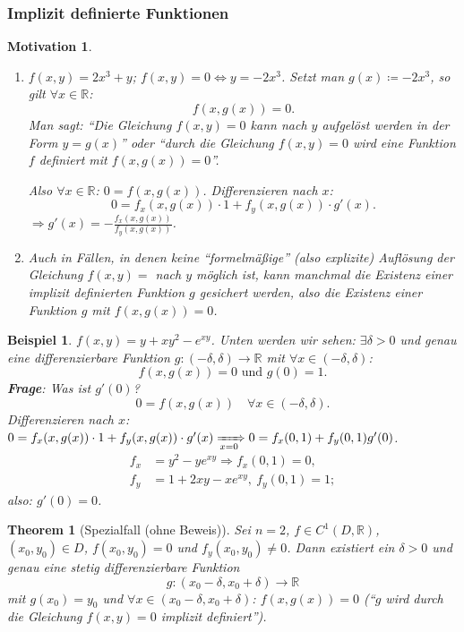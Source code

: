 \documentclass[12pt]{extreport} %
\newcommand{\R}{\mathbb{R}}
\theoremstyle{named}
\newtheorem{unnamedtheorem}{Theorem} \counterwithin{unnamedtheorem}{chapter}
\theoremstyle{nnamed}
\theoremstyle{itshape}
\theoremstyle{normal}
\newtheorem*{beispiel*}{Beispiel}
\newtheorem*{motivation}{Motivation}
\begin{document}
\subsubsection*{Implizit definierte Funktionen}

\begin{motivation} ~\
	\begin{enumerate}
		\item $f(x, y) = 2 x^{3} + y$; $f(x, y) = 0 \iff y = - 2 x^{3}$. Setzt man $g(x) \coloneqq - 2x^{3}$, so gilt $\forall x \in \R$:
			$$ f(x, g(x)) = 0. $$
			Man sagt: \enquote{Die Gleichung $f(x, y) = 0$ kann nach $y$ aufgelöst werden in der Form $y = g(x)$} 
			oder \enquote{durch die Gleichung $f(x, y) = 0$ wird eine Funktion $f$ definiert mit $f(x, g(x)) = 0$}.
			
			\bigskip
			
			Also $\forall x \in \R$: $0 = f(x, g(x))$. Differenzieren nach $x$:
			$$ 0 = f_{x}(x, g(x)) \cdot 1 + f_{y}(x, g(x)) \cdot g'(x). $$
			$\Rightarrow g'(x) = - \frac{f_{x}(x, g(x))}{f_{y}(x, g(x))}$.
		\item Auch in Fällen, in denen keine \enquote{formelmä{\ss}ige} (also explizite) Auflösung der Gleichung $f(x, y) = $ nach $y$ möglich ist, kann manchmal die Existenz einer implizit definierten Funktion $g$ gesichert werden, also die Existenz einer Funktion $g$ mit $f(x, g(x)) = 0$.
	\end{enumerate}
\end{motivation}


\begin{beispiel*}
	$f(x, y) = y + xy^{2} - e^{xy}$. Unten werden wir sehen: $\exists \delta > 0$ und genau eine differenzierbare Funktion $g \colon (-\delta, \delta) \rightarrow \R$ mit $\forall x \in (-\delta, \delta)$:
	$$ f(x, g(x)) = 0 \text{ und } g(0) = 1.  $$	
	\textbf{Frage}: Was ist $g'(0)$?
	$$ 0 = f(x, g(x)) \quad \forall x \in (-\delta, \delta). $$
	Differenzieren nach $x$: $0 = f_{x}(x, g(x)) \cdot 1 + f_{y}(x, g(x)) \cdot g'(x) \xRightarrow[x = 0]{} 0 = f_{x}(0, 1) + f_{y}(0, 1) g'(0)$.
	\begin{align*}
		f_{x} & = y^{2} - y e^{xy} \Rightarrow f_{x}(0, 1) = 0, \\
		f_{y} & = 1 + 2xy - xe^{xy}, ~ f_{y}(0, 1) = 1;
	\end{align*}
	also: $g'(0) = 0$.
\end{beispiel*}

\begin{unnamedtheorem}[Spezialfall (ohne Beweis)] \label{19.4:satz}
	Sei $n = 2$, $f \in C^{1}(D, \R)$, $(x_{0}, y_{0}) \in D$, $f(x_{0}, y_{0}) = 0$ und $f_{y}(x_{0}, y_{0}) \neq 0$. Dann existiert ein $\delta > 0$ und genau eine stetig differenzierbare Funktion
	$$ g \colon (x_{0} - \delta, x_{0} + \delta ) \rightarrow \R $$
	mit $g(x_{0}) = y_{0}$ und $\forall x \in (x_{0} - \delta, x_{0} + \delta)$: $f(x, g(x)) = 0$ (\enquote{$g$ wird durch die Gleichung $f(x, y) = 0$ implizit definiert}).
\end{unnamedtheorem}
\end{document}
